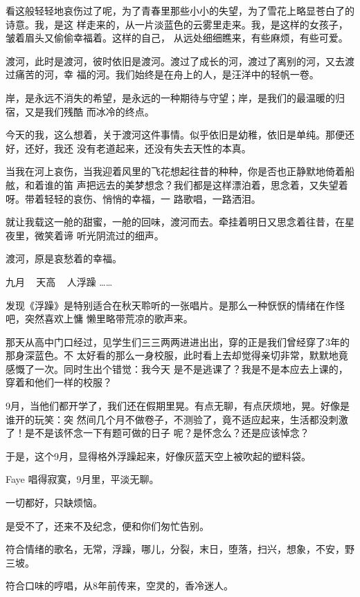 \documentclass[12pt,a4paper]{article}
\begin{document}
		看这般轻轻地哀伤过了呢，为了青春里那些小小的失望，为了雪花上略显苍白了的诗意。我，是这
	样走来的，从一片淡蓝色的云雾里走来。我，是这样的女孩子，皱着眉头又偷偷幸福着。这样的自己，
	从远处细细瞧来，有些麻烦，有些可爱。

		渡河，此时是渡河，彼时依旧是渡河。渡过了成长的河，渡过了离别的河，又去渡过痛苦的河，幸
	福的河。我们始终是在舟上的人，是汪洋中的轻帆一卷。

		岸，是永远不消失的希望，是永远的一种期待与守望；岸，是我们的最温暖的归宿，又是我们残酷
	而冰冷的终点。

		今天的我，这么想着，关于渡河这件事情。似乎依旧是幼稚，依旧是单纯。那便还好，还好，我还
	没有老道起来，还没有失去天性的本真。

		当我在河上哀伤，当我迎着风里的飞花想起往昔的种种，你是否也正静默地倚着船舷，和着谁的笛
	声把远去的美梦想念？我们都是这样漂泊着，思念着，又失望着呀。带着轻轻的哀伤、悄悄的幸福，一
	路歌唱，一路洒泪。

		就让我载这一舱的甜蜜，一舱的回味，渡河而去。牵挂着明日又思念着往昔，在星夜里，微笑着谛
	听光阴流过的细声。

		渡河，原是哀愁着的幸福。

	\endwriting



		\longpoem{}{}{}
			九月 ~ 天高 ~ 人浮躁 ……
		\endlongpoem

		发现《浮躁》是特别适合在秋天聆听的一张唱片。是那么一种恹恹的情绪在作怪吧，突然喜欢上慵
	懒里略带荒凉的歌声来。

		那天从高中门口经过，见学生们三三两两进进出出，穿的正是我们曾经穿了3年的那身深蓝色。不
	太好看的那么一身校服，此时看上去却觉得亲切非常，默默地竟感慨了一次。同时生出个错觉：我今天
	是不是逃课了？我是不是本应去上课的，穿着和他们一样的校服？

		9月，当他们都开学了，我们还在假期里晃。有点无聊，有点厌烦地，晃。好像是谁开的玩笑：突
	然间几个月不做卷子，不测验了，竟不适应起来，生活都没刺激了！是不是该怀念一下有题可做的日子
	呢？是怀念么？还是应该悼念？

		于是，这个9月，显得格外浮躁起来，好像灰蓝天空上被吹起的塑料袋。

		Faye 唱得寂寞，9月里，平淡无聊。

		一切都好，只缺烦恼。

		是受不了，还来不及纪念，便和你们匆忙告别。

		符合情绪的歌名，无常，浮躁，哪儿，分裂，末日，堕落，扫兴，想象，不安，野三坡。

		符合口味的哼唱，从8年前传来，空灵的，香冷迷人。
\end{document}

